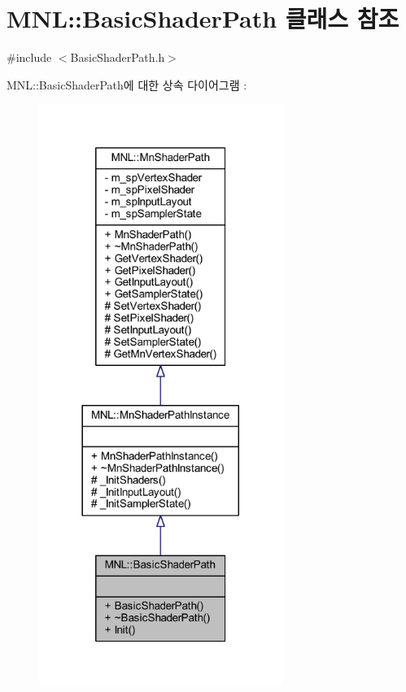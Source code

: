 \hypertarget{class_m_n_l_1_1_basic_shader_path}{}\section{M\+NL\+:\+:Basic\+Shader\+Path 클래스 참조}
\label{class_m_n_l_1_1_basic_shader_path}


{\ttfamily \#include $<$Basic\+Shader\+Path.\+h$>$}



M\+NL\+:\+:Basic\+Shader\+Path에 대한 상속 다이어그램 \+: \nopagebreak
\begin{figure}[H]
\begin{center}
\leavevmode
\includegraphics[width=224pt]{class_m_n_l_1_1_basic_shader_path__inherit__graph}
\end{center}
\end{figure}


